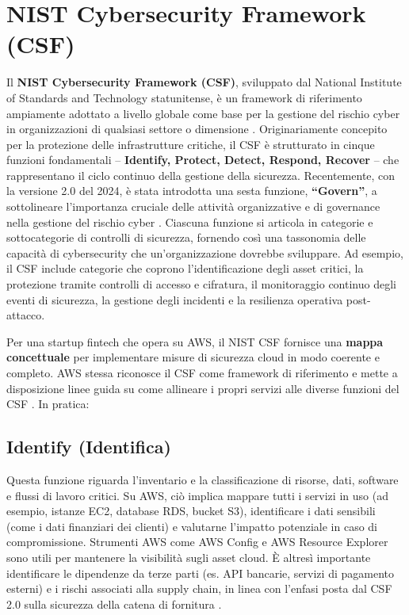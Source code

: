 \section{NIST Cybersecurity Framework (CSF)}
\label{sec:nist_csf}

Il \textbf{NIST Cybersecurity Framework (CSF)}, sviluppato dal National Institute of Standards and Technology statunitense, è un framework di riferimento ampiamente adottato a livello globale come base per la gestione del rischio cyber in organizzazioni di qualsiasi settore o dimensione \cite{awsNist}. Originariamente concepito per la protezione delle infrastrutture critiche, il CSF è strutturato in cinque funzioni fondamentali – \textbf{Identify, Protect, Detect, Respond, Recover} – che rappresentano il ciclo continuo della gestione della sicurezza. Recentemente, con la versione 2.0 del 2024, è stata introdotta una sesta funzione, \textbf{\enquote{Govern}}, a sottolineare l'importanza cruciale delle attività organizzative e di governance nella gestione del rischio cyber \cite{awsWhitepaperCSF2}. Ciascuna funzione si articola in categorie e sottocategorie di controlli di sicurezza, fornendo così una tassonomia delle capacità di cybersecurity che un'organizzazione dovrebbe sviluppare. Ad esempio, il CSF include categorie che coprono l'identificazione degli asset critici, la protezione tramite controlli di accesso e cifratura, il monitoraggio continuo degli eventi di sicurezza, la gestione degli incidenti e la resilienza operativa post-attacco.

Per una startup fintech che opera su AWS, il NIST CSF fornisce una \textbf{mappa concettuale} per implementare misure di sicurezza cloud in modo coerente e completo. AWS stessa riconosce il CSF come framework di riferimento e mette a disposizione linee guida su come allineare i propri servizi alle diverse funzioni del CSF \cite{awsWhitepaperCSF2}. In pratica:

\subsection{Identify (Identifica)}
\label{subsec:nist_csf_identify}
Questa funzione riguarda l'inventario e la classificazione di risorse, dati, software e flussi di lavoro critici. Su AWS, ciò implica mappare tutti i servizi in uso (ad esempio, istanze EC2, database RDS, bucket S3), identificare i dati sensibili (come i dati finanziari dei clienti) e valutarne l'impatto potenziale in caso di compromissione. Strumenti AWS come AWS Config e AWS Resource Explorer sono utili per mantenere la visibilità sugli asset cloud. È altresì importante identificare le dipendenze da terze parti (es. API bancarie, servizi di pagamento esterni) e i rischi associati alla supply chain, in linea con l'enfasi posta dal CSF 2.0 sulla sicurezza della catena di fornitura \cite{awsWhitepaperCSF2}.

